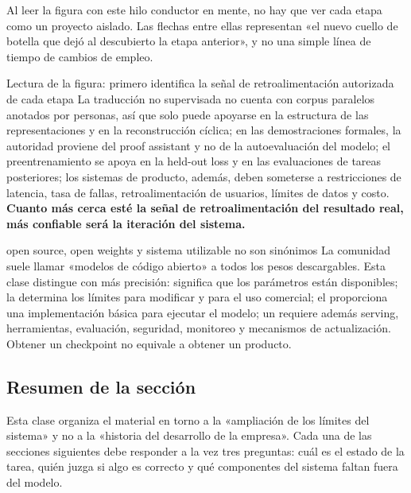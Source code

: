 Al leer la figura con este hilo conductor en mente, no hay que ver cada etapa como un proyecto aislado. Las flechas entre ellas representan «el nuevo cuello de botella que dejó al descubierto la etapa anterior», y no una simple línea de tiempo de cambios de empleo.


\begin{knowledgebox}{Lectura de la figura: primero identifica la señal de retroalimentación autorizada de cada etapa}
La traducción no supervisada no cuenta con corpus paralelos anotados por personas, así que solo puede apoyarse en la estructura de las representaciones y en la reconstrucción cíclica; en las demostraciones formales, la autoridad proviene del proof assistant y no de la autoevaluación del modelo; el preentrenamiento se apoya en la held-out loss y en las evaluaciones de tareas posteriores; los sistemas de producto, además, deben someterse a restricciones de latencia, tasa de fallas, retroalimentación de usuarios, límites de datos y costo. \textbf{Cuanto más cerca esté la señal de retroalimentación del resultado real, más confiable será la iteración del sistema.}
\end{knowledgebox}

\begin{warningbox}{open source, open weights y sistema utilizable no son sinónimos}
La comunidad suele llamar «modelos de código abierto» a todos los pesos descargables. Esta clase distingue con más precisión:  significa que los parámetros están disponibles; la  determina los límites para modificar y para el uso comercial; el  proporciona una implementación básica para ejecutar el modelo; un  requiere además serving, herramientas, evaluación, seguridad, monitoreo y mecanismos de actualización. Obtener un checkpoint no equivale a obtener un producto.
\end{warningbox}

\subsection{Resumen de la sección}

Esta clase organiza el material en torno a la «ampliación de los límites del sistema» y no a la «historia del desarrollo de la empresa». Cada una de las secciones siguientes debe responder a la vez tres preguntas: cuál es el estado de la tarea, quién juzga si algo es correcto y qué componentes del sistema faltan fuera del modelo.
